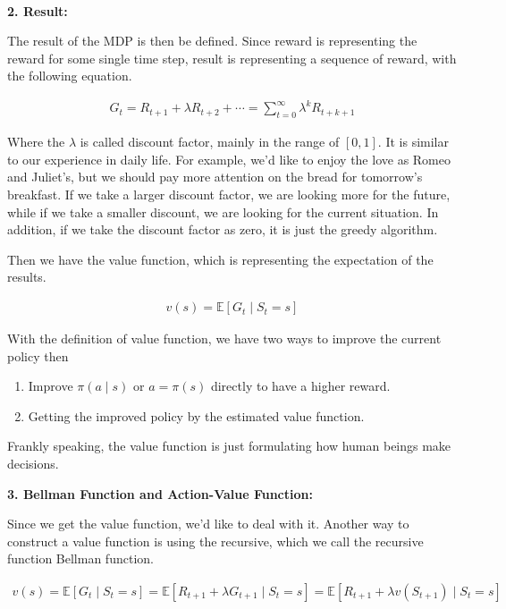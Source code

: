 \documentclass[a4paper,12pt]{article}
\begin{document}
~\\

\textbf{2. Result:}

The result of the MDP is then be defined. Since reward is representing the reward for some single time step, result is representing a sequence of reward, with the following equation.

\begin{align*}
G_t = R_{t+1} + \lambda R_{t+2} + \cdots = \sum_{t = 0}^{\infty} \lambda^k R_{t+k+1}
\end{align*}

Where the $\lambda$ is called discount factor, mainly in the range of $[0,1]$. It is similar to our experience in daily life. For example, we'd like to enjoy the love as Romeo and Juliet's, but we should pay more attention on the bread for tomorrow's breakfast. If we take a larger discount factor, we are looking more for the future, while if we take a smaller discount, we are looking for the current situation. In addition, if we take the discount factor as zero, it is just the greedy algorithm.

Then we have the value function, which is representing the expectation of the results.

\begin{align*}
v(s) = \mathbb{E}[G_t \mid S_t = s]
\end{align*}

With the definition of value function, we have two ways to improve the current policy then

\begin{enumerate}
\item Improve $\pi(a\mid s)$ or $a = \pi(s)$ directly to have a higher reward.
\item Getting the improved policy by the estimated value function.
\end{enumerate}

Frankly speaking, the value function is just formulating how human beings make decisions.

\textbf{3. Bellman Function and Action-Value Function:}

Since we get the value function, we'd like to deal with it. Another way to construct a value function is using the recursive, which we call the recursive function Bellman function.

\begin{align*}
v(s) = \mathbb{E}[G_t \mid S_t = s] = \mathbb{E}[R_{t+1} + \lambda G_{t+1} \mid S_t = s] = \mathbb{E}[R_{t+1} + \lambda v(S_{t+1}) \mid S_t = s]
\end{align*}
\end{document}
